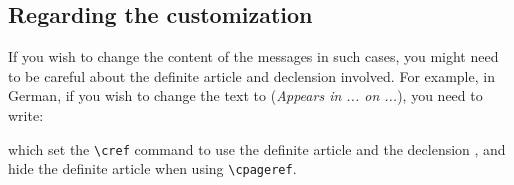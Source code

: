 \documentclass[
    use style = plain,
    title in boldface,
    emphasize theorems,
    simple name, %
    name in link,
]{einfart}
\begin{document}

\subsection{Regarding the customization}

If you wish to change the content of the messages in such cases, you might need to be careful about the definite article and declension involved. For example, in German, if you wish to change the text to  (\emph{Appears in ... on ...}), you need to write:
\begin{code}
\SetForwardReferenceRefForm{\crefthe[in,dat.]}
\SetForwardReferencePagerefForm{\cpagerefthe[noun]}
\end{code}
which set the \lstinline|\cref| command to use the definite article  and the declension , and hide the definite article when using \lstinline|\cpageref|.
\end{document}
